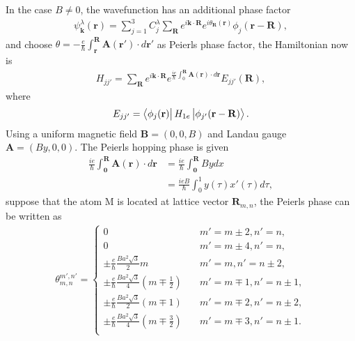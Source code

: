 \documentclass{article}
\begin{document}
In the case $B \neq 0$, the wavefunction has an additional phase factor
\begin{gather}
	\psi_{\mathbf{k}}^{\lambda} (\mathbf{r}) = \sum_{j=1}^{3} C_{j}^{\lambda} \sum_{\mathbf{R}} e^{i \mathbf{k} \cdot \mathbf{R}} e^{i \theta_{\mathbf{R}} (\mathbf{r})} \phi_{j} (\mathbf{r} - \mathbf{R}),
\end{gather}
and choose $\theta = -\frac{e}{\hbar}\int_{\mathbf{r}}^{\mathbf{R}} \mathbf{A}(\mathbf{r}') \cdot d \mathbf{r}'$ as Peierls phase factor, the Hamiltonian now is
\begin{gather}
	H_{j  j' }^{} = \sum_{\mathbf{R}} e^{i \mathbf{k} \cdot \mathbf{R}} e^{\frac{ie}{\hbar} \int_{0}^{\mathbf{R}} \mathbf{A}(\mathbf{r}) \cdot d \mathbf{r}} E_{jj'} (\mathbf{R}),
\end{gather}
where
\begin{gather}
	E_{jj'} = \bra{\phi_{j}(\mathbf{r})} H_{1e} \ket{\phi_{j'} (\mathbf{r} - \mathbf{R})}.
\end{gather}
Using a uniform magnetic field $\mathbf{B} = (0,0,B)$ and Landau gauge $\mathbf{A} = (By,0,0)$. The Peierls hopping phase is given
\begin{equation}
	\begin{aligned}
		\frac{ie}{\hbar} \int_{\mathbf{0}}^{\mathbf{R}} \mathbf{A}(\mathbf{r}) \cdot d \mathbf{r} & = \frac{ie}{\hbar} \int_{\mathbf{0}}^{\mathbf{R}} B y dx \\
		                                                                                          & = \frac{ieB}{\hbar} \int_{0}^{1} y(\tau) x'(\tau) d\tau,
	\end{aligned}
\end{equation}
suppose that the atom M is located at lattice vector $\mathbf{R}_{m,n}$, the Peierls phase can be written as
\begin{gather}
	\theta_{m,n}^{m',n'} =
	\begin{cases}
		0                                                                             & \quad m' = m \pm 2, n' = n  ,      \\
		0                                                                             & \quad m' = m \pm 4, n' = n  ,      \\
		\pm \frac{e}{\hbar} \frac{B a^{2} \sqrt{3}}{2} m                              & \quad m' = m , n' = n \pm 2,       \\
		\pm \frac{e}{\hbar} \frac{B a^{2} \sqrt{3}}{4} \left(m \mp \frac{1}{2}\right) & \quad m' = m \mp 1, n' = n \pm 1 , \\
		\pm \frac{e}{\hbar} \frac{B a^{2} \sqrt{3}}{2} (m \mp 1)                      & \quad m' = m \mp 2, n' = n \pm 2,  \\
		\pm \frac{e}{\hbar} \frac{B a^{2} \sqrt{3}}{4} \left(m \mp \frac{3}{2}\right) & \quad m' = m \mp 3, n' = n \pm 1.  \\
	\end{cases}
\end{gather}
\end{document}
